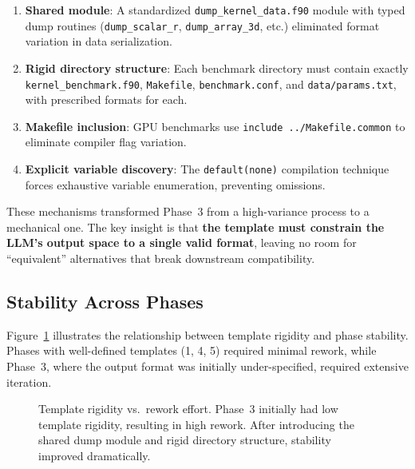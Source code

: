 \documentclass[conference]{IEEEtran}
\begin{document}
\begin{enumerate}
\item \textbf{Shared module}: A standardized \texttt{dump\_kernel\_data.f90}
  module with typed dump routines (\texttt{dump\_scalar\_r},
  \texttt{dump\_array\_3d}, etc.) eliminated format variation in data
  serialization.

\item \textbf{Rigid directory structure}: Each benchmark directory must
  contain exactly \texttt{kernel\_benchmark.f90}, \texttt{Makefile},
  \texttt{benchmark.conf}, and \texttt{data/params.txt}, with prescribed
  formats for each.

\item \textbf{Makefile inclusion}: GPU benchmarks use
  \texttt{include ../Makefile.common} to eliminate compiler flag variation.

\item \textbf{Explicit variable discovery}: The \texttt{default(none)}
  compilation technique forces exhaustive variable enumeration, preventing
  omissions.
\end{enumerate}

These mechanisms transformed Phase~3 from a high-variance process to a
mechanical one. The key insight is that \textbf{the template must constrain
the LLM's output space to a single valid format}, leaving no room for
``equivalent'' alternatives that break downstream compatibility.

\subsection{Stability Across Phases}

Figure~\ref{fig:stability} illustrates the relationship between template
rigidity and phase stability. Phases with well-defined templates (1, 4, 5)
required minimal rework, while Phase~3, where the output format was
initially under-specified, required extensive iteration.

\begin{figure}[t]
\centering
\caption{Template rigidity vs.\ rework effort. Phase~3 initially had
  low template rigidity, resulting in high rework. After introducing
  the shared dump module and rigid directory structure, stability improved
  dramatically.}
\label{fig:stability}
\end{figure}
\end{document}
